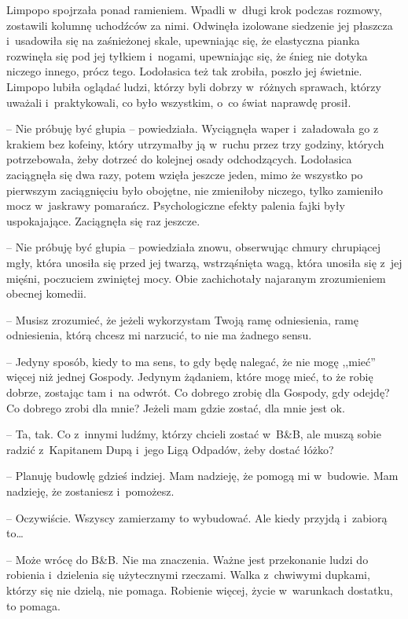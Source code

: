 \documentclass[oneside,polish,11pt,sfheadings]{mwbk}
\begin{document}
Limpopo spojrzała ponad ramieniem. Wpadli w~długi krok podczas rozmowy,
zostawili kolumnę uchodźców za nimi. Odwinęła izolowane siedzenie jej
płaszcza i~usadowiła się na zaśnieżonej skale, upewniając się, że
elastyczna pianka rozwinęła się pod jej tyłkiem i~nogami, upewniając
się, że śnieg nie dotyka niczego innego, prócz tego. Lodołasica też tak
zrobiła, poszło jej świetnie. Limpopo lubiła oglądać ludzi, którzy byli
dobrzy w~różnych sprawach, którzy uważali i~praktykowali, co było
wszystkim, o~co świat naprawdę prosił.

-- Nie próbuję być głupia -- powiedziała. Wyciągnęła waper i~załadowała go
z krakiem bez kofeiny, który utrzymałby ją w~ruchu przez trzy godziny,
których potrzebowała, żeby dotrzeć do kolejnej osady odchodzących.
Lodołasica zaciągnęła się dwa razy, potem wzięła jeszcze jeden, mimo że
wszystko po pierwszym zaciągnięciu było obojętne, nie zmieniłoby
niczego, tylko zamieniło mocz w~jaskrawy pomarańcz. Psychologiczne
efekty palenia fajki były uspokajające. Zaciągnęła się raz jeszcze.

-- Nie próbuję być głupia -- powiedziała znowu, obserwując chmury
chrupiącej mgły, która unosiła się przed jej twarzą, wstrząśnięta wagą,
która unosiła się z~jej mięśni, poczuciem zwiniętej mocy. Obie
zachichotały najaranym zrozumieniem obecnej komedii. 

-- Musisz zrozumieć,
że jeżeli wykorzystam Twoją ramę odniesienia, ramę odniesienia, którą
chcesz mi narzucić, to nie ma żadnego sensu.

-- Jedyny sposób, kiedy to ma sens, to gdy będę nalegać, że nie mogę
,,mieć'' więcej niż jednej Gospody. Jedynym żądaniem, które mogę mieć,
to że robię dobrze, zostając tam i~na odwrót. Co dobrego zrobię dla
Gospody, gdy odejdę? Co dobrego zrobi dla mnie? Jeżeli mam gdzie zostać,
dla mnie jest ok.

-- Ta, tak. Co z~innymi ludźmy, którzy chcieli zostać w~B\&B, ale muszą
sobie radzić z~Kapitanem Dupą i~jego Ligą Odpadów, żeby dostać łóżko?

-- Planuję budowlę gdzieś indziej. Mam nadzieję, że pomogą mi w~budowie.
Mam nadzieję, że zostaniesz i~pomożesz.

-- Oczywiście. Wszyscy zamierzamy to wybudować. Ale kiedy przyjdą i~zabiorą to\ldots 

-- Może wrócę do B\&B. Nie ma znaczenia. Ważne jest przekonanie ludzi do
robienia i~dzielenia się użytecznymi rzeczami. Walka z~chwiwymi dupkami,
którzy się nie dzielą, nie pomaga. Robienie więcej, życie w~warunkach
dostatku, to pomaga.
\end{document}
